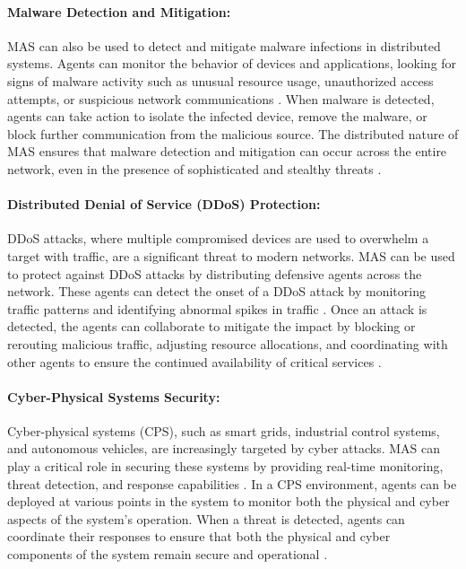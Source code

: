 \paragraph{Malware Detection and Mitigation:}
MAS can also be used to detect and mitigate malware infections in distributed systems. Agents can monitor the behavior of devices and applications, looking for signs of malware activity such as unusual resource usage, unauthorized access attempts, or suspicious network communications \cite{buczak2016survey}. When malware is detected, agents can take action to isolate the infected device, remove the malware, or block further communication from the malicious source. The distributed nature of MAS ensures that malware detection and mitigation can occur across the entire network, even in the presence of sophisticated and stealthy threats \cite{buczak2016survey}.

\paragraph{Distributed Denial of Service (DDoS) Protection:}
DDoS attacks, where multiple compromised devices are used to overwhelm a target with traffic, are a significant threat to modern networks. MAS can be used to protect against DDoS attacks by distributing defensive agents across the network. These agents can detect the onset of a DDoS attack by monitoring traffic patterns and identifying abnormal spikes in traffic \cite{buczak2016survey}. Once an attack is detected, the agents can collaborate to mitigate the impact by blocking or rerouting malicious traffic, adjusting resource allocations, and coordinating with other agents to ensure the continued availability of critical services \cite{buczak2016survey}.

\paragraph{Cyber-Physical Systems Security:}
Cyber-physical systems (CPS), such as smart grids, industrial control systems, and autonomous vehicles, are increasingly targeted by cyber attacks. MAS can play a critical role in securing these systems by providing real-time monitoring, threat detection, and response capabilities \cite{kolias2011swarm}. In a CPS environment, agents can be deployed at various points in the system to monitor both the physical and cyber aspects of the system's operation. When a threat is detected, agents can coordinate their responses to ensure that both the physical and cyber components of the system remain secure and operational \cite{kolias2011swarm}.


